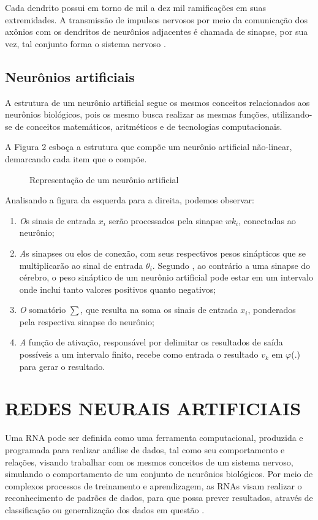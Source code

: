 Cada dendrito possui em torno de mil a dez mil ramificações em suas extremidades. A transmissão de impulsos nervosos por meio da comunicação dos axônios com os dendritos de neurônios adjacentes é chamada de sinapse, por sua vez, tal conjunto forma o sistema nervoso \cite{neto}.

\subsection{Neurônios artificiais}
A estrutura de um neurônio artificial segue os mesmos conceitos relacionados aos neurônios biológicos, pois os mesmo busca realizar as mesmas funções, utilizando-se de conceitos matemáticos, aritméticos e de tecnologias computacionais.

A Figura 2 esboça a estrutura que compõe um neurônio artificial não-linear, demarcando cada item que o compõe. 

\begin{figure}[h]
	\centering
	\caption{Representação de um neurônio artificial}
	\label{exec-linearmente-separavel}
\end{figure}

Analisando a figura da esquerda para a direita, podemos observar: 

\begin{enumerate}
	\item \textit Os sinais de entrada $x_i$ serão processados pela sinapse $wk_i$, conectadas ao neurônio;
	\item \textit As sinapses ou elos de conexão, com seus respectivos pesos sinápticos que se multiplicarão ao sinal de entrada $\theta_i$. Segundo , ao contrário a uma sinapse do cérebro, o peso sináptico de um neurônio artificial pode estar em um intervalo onde inclui tanto valores positivos quanto negativos;
	\item \textit O somatório $\sum$, que resulta na soma os sinais de entrada $x_i$, ponderados pela respectiva sinapse do neurônio;
	\item \textit A função de ativação, responsável por delimitar os resultados de saída possíveis a um intervalo finito, recebe como entrada o resultado $v_k$ em $\varphi$(.) para gerar o resultado.
\end{enumerate}

\section{REDES NEURAIS ARTIFICIAIS}\label{sec:redes-neurais}
Uma RNA pode ser definida como uma ferramenta computacional, produzida e programada para realizar análise de dados, tal como seu comportamento e relações, visando trabalhar com os mesmos conceitos de um sistema nervoso, simulando o comportamento de um conjunto de neurônios biológicos. Por meio de complexos processos de treinamento e aprendizagem, as RNAs visam realizar o reconhecimento de padrões de dados, para que possa prever resultados, através de classificação ou generalização dos dados em questão \cite{haykin2009}.

